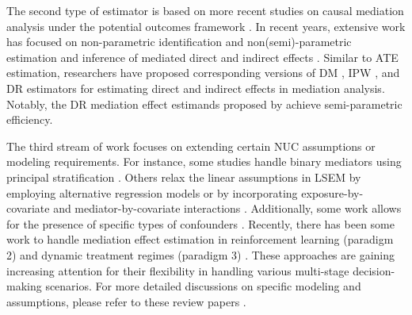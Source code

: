 The second type of estimator is based on more recent studies on causal mediation analysis under the potential outcomes framework \citep{imai2010general}. In recent years, extensive work has focused on non-parametric identification and non(semi)-parametric estimation and inference of mediated direct and indirect effects \citep{tchetgen2012semiparametric}. Similar to \acrshort{ATE} estimation, researchers have proposed corresponding versions of \acrshort{DM} \cite{imai2010general}, \acrshort{IPW} \citep{hong2010ratio}, and \acrshort{DR} \citep{tchetgen2012semiparametric} estimators for estimating direct and indirect effects in mediation analysis. Notably, the \acrshort{DR} mediation effect estimands proposed by \citet{tchetgen2012semiparametric} achieve semi-parametric efficiency.




The third stream of work focuses on extending certain NUC assumptions or modeling requirements. For instance, some studies handle binary mediators using principal stratification \citep{rubin2004direct, vanderweele2008simple, gallop2009mediation}. Others relax the linear assumptions in LSEM by employing alternative regression models \cite{mackinnon2007intermediate} or by incorporating exposure-by-covariate and mediator-by-covariate interactions \citep{hayes2017introduction}. Additionally, some work allows for the presence of specific types of confounders \citep{vanderweele2009conceptual, vanderweele2015explanation}. Recently, there has been some work to handle mediation effect estimation in reinforcement learning (paradigm 2) \citep{ge2023reinforcement} and dynamic treatment regimes (paradigm 3) \citep{selig2009mediation, zheng2017longitudinal, roth2013mediation}. These approaches are gaining increasing attention for their flexibility in handling various multi-stage decision-making scenarios. For more detailed discussions on specific modeling and assumptions, please refer to these review papers \citep{hayes2017introduction, ten2012review, rijnhart2021mediation, preacher2015advances}.

